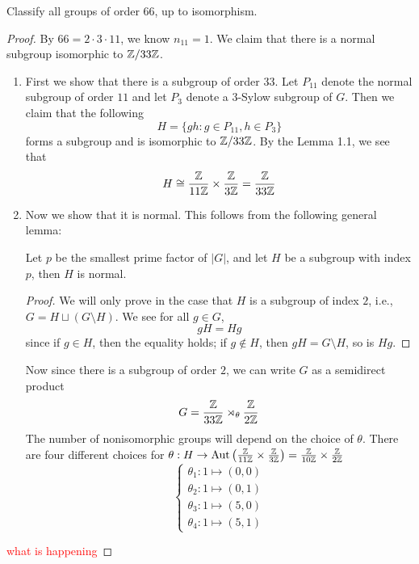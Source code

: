\begin{prob}[S2016-Q1]
    Classify all groups of order $66$, up to isomorphism.
\end{prob}
\begin{proof}
    By $66=2\cdot 3\cdot 11$, we know $n_{11}=1$. We claim that there is a normal subgroup isomorphic to $\mathbb{Z}/33\mathbb{Z}$. 
    \begin{enumerate}
        \item First we show that there is a subgroup of order $33$. Let $P_{11}$ denote the normal subgroup of order $11$ and let $P_{3}$ denote a $3$-Sylow subgroup of $G$. Then we claim that the following
        \begin{equation*}
            H=\{gh: g\in P_{11}, h\in P_{3}\}
        \end{equation*}
        forms a subgroup and is isomorphic to $\mathbb{Z}/33\mathbb{Z}$. By the Lemma 1.1, we see that 
        \begin{equation*}
            H\cong\frac{\mathbb{Z}}{11\mathbb{Z}}\times\frac{\mathbb{Z}}{3\mathbb{Z}}=\frac{\mathbb{Z}}{33\mathbb{Z}}
        \end{equation*}
        \item Now we show that it is normal. This follows from the following general lemma:
        \begin{lem}
            Let $p$ be the smallest prime factor of $|G|$, and let $H$ be a subgroup with index $p$, then $H$ is normal.
        \end{lem}
        \begin{proof}
            We will only prove in the case that $H$ is a subgroup of index $2$, i.e., $G=H\sqcup (G\setminus H)$. We see for all $g\in G$, 
            \begin{equation*}
                gH=Hg
            \end{equation*}
            since if $g\in H$, then the equality holds; if $g\not\in H$, then $gH=G\setminus H$, so is $Hg$.  
        \end{proof}
        Now since there is a subgroup of order $2$, we can write $G$ as a semidirect product 
        \begin{equation*}
            G=\frac{\mathbb{Z}}{33\mathbb{Z}}\rtimes_\theta \frac{\mathbb{Z}}{2\mathbb{Z}}
        \end{equation*}
        The number of nonisomorphic groups will depend on the choice of $\theta$. There are four different choices for $\theta: H\to\text{Aut}\left(\frac{\mathbb{Z}}{11\mathbb{Z}}\times\frac{\mathbb{Z}}{3\mathbb{Z}}\right)=\frac{\mathbb{Z}}{10\mathbb{Z}}\times\frac{\mathbb{Z}}{2\mathbb{Z}}$
        \begin{equation*}
            \begin{cases}
                \theta_1: 1\mapsto (0,0)\\
                \theta_2: 1\mapsto (0,1)\\
                \theta_3: 1\mapsto (5, 0)\\
                \theta_4: 1\mapsto (5,1)
            \end{cases}
        \end{equation*}
    \end{enumerate} 

    \textcolor{red}{what is happening}
\end{proof}



